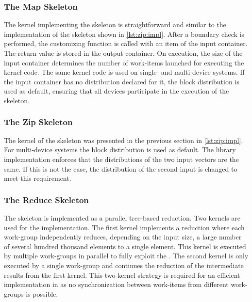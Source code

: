 \subsubsection{The Map Skeleton}
The \OpenCL kernel implementing the \map skeleton is straightforward and similar to the implementation of the \zip skeleton shown in \autoref{lst:zip:impl}.
After a boundary check is performed, the customizing function is called with an item of the input container.
The return value is stored in the output container.
On execution, the size of the input container determines the number of work-items launched for executing the kernel code.
The same kernel code is used on single- and multi-device systems.
If the input container has no distribution declared for it, the block distribution is used as default, ensuring that all devices participate in the execution of the \map skeleton.






\subsubsection{The Zip Skeleton}
The \OpenCL kernel of the \zip skeleton was presented in the previous section in \autoref{lst:zip:impl}.
For multi-device systems the block distribution is used as default.
The \SkelCL library implementation enforces that the distributions of the two input vectors are the same.
If this is not the case, the distribution of the second input is changed to meet this requirement.





\subsubsection{The Reduce Skeleton}
The \reduce skeleton is implemented as a parallel tree-based reduction.
Two \OpenCL kernels are used for the implementation.
The first kernel implements a reduction where each work-group independently reduces, depending on the input size, a large number of several hundred thousand elements to a single element.
This kernel is executed by multiple work-groups in parallel to fully exploit the \GPU.
The second kernel is only executed by a single work-group and continues the reduction of the intermediate results from the first kernel.
This two-kernel strategy is required for an efficient implementation in \OpenCL as no synchronization between work-items from different work-groups is possible.

